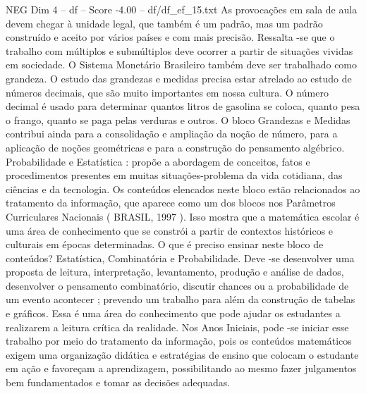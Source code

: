 \begin{textsample}{NEG Dim 4 – df – Score -4.00 – df/df\_ef\_15.txt}
As provocações em sala de aula devem chegar à unidade legal, que também é um padrão, mas um padrão construído e aceito por vários países e com mais precisão.
Ressalta -se que o trabalho com múltiplos e submúltiplos deve ocorrer a partir de situações vividas em sociedade.
O Sistema Monetário Brasileiro também deve ser trabalhado como grandeza.
O estudo das grandezas e medidas precisa estar atrelado ao estudo de números decimais, que são muito importantes em nossa cultura.
O número decimal é usado para determinar quantos litros de gasolina se coloca, quanto pesa o frango, quanto se paga pelas verduras e outros.
O bloco Grandezas e Medidas contribui ainda para a consolidação e ampliação da noção de número, para a aplicação de noções geométricas e para a construção do pensamento algébrico.
Probabilidade e Estatística : propõe a abordagem de conceitos, fatos e procedimentos presentes em muitas situações-problema da vida cotidiana, das ciências e da tecnologia.
Os conteúdos elencados neste bloco estão relacionados ao tratamento da informação, que aparece como um dos blocos nos Parâmetros Curriculares Nacionais ( BRASIL, 1997 ).
Isso mostra que a matemática escolar é uma área de conhecimento que se constrói a partir de contextos históricos e culturais em épocas determinadas.
O que é preciso ensinar neste bloco de conteúdos?
Estatística, Combinatória e Probabilidade.
Deve -se desenvolver uma proposta de leitura, interpretação, levantamento, produção e análise de dados, desenvolver o pensamento combinatório, discutir chances ou a probabilidade de um evento acontecer ; prevendo um trabalho para além da construção de tabelas e gráficos.
Essa é uma área do conhecimento que pode ajudar os estudantes a realizarem a leitura crítica da realidade.
Nos Anos Iniciais, pode -se iniciar esse trabalho por meio do tratamento da informação, pois os conteúdos matemáticos exigem uma organização didática e estratégias de ensino que colocam o estudante em ação e favoreçam a aprendizagem, possibilitando ao mesmo fazer julgamentos bem fundamentados e tomar as decisões adequadas.

\end{textsample}
